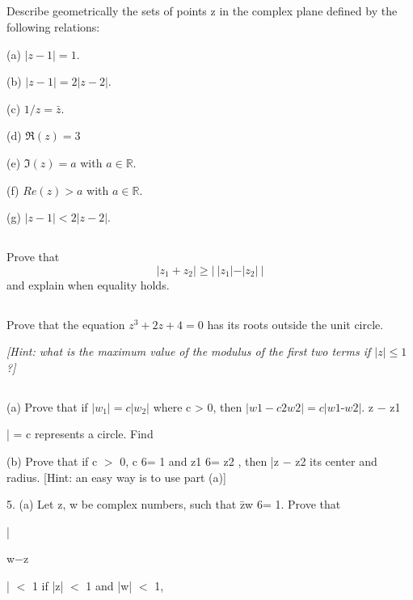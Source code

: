 
\subsection{}

Describe geometrically the sets of points z in the complex plane defined by the following relations:

(a) $|z - 1| = 1$.

(b) $|z - 1| = 2|z - 2|$.

(c) $1/z = \bar z$.

(d) $\Re(z) = 3$

(e) $\Im(z) = a$ with $a \in \mathbb{R}$.

(f) $Re(z) > a$ with $a \in \mathbb R$.

(g) $|z - 1| < 2|z - 2|$.


\subsection{}
Prove that $$|z_1 + z_2 | \geq |~|z_1 | - |z_2 |~|$$ and explain when equality holds.

\subsection{}
Prove that the equation $z^3 + 2z + 4 = 0$ has its roots outside the unit circle. 

\textit{[Hint: what is the maximum value of the modulus of the first two terms if $|z| \leq 1$?]}

\subsection{}

(a) Prove that if $|w_1 | = c|w_2 |$ where c > 0, then 
$|w1- c2 w2 | = c|w1 $-$ w2 |$.
z $-$ z1


| = c represents a circle. Find


(b) Prove that if c $>$ 0, c 6= 1 and z1 6= z2 , then |z $-$ z2 its center and radius. 
[Hint: an easy way is to use part (a)]




5. (a) Let z, w be complex numbers, such that z̄w 6= 1. Prove that



|

w$-$z




| $<$ 1 if |z| $<$ 1 and |w| $<$ 1,




